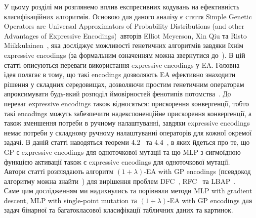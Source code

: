 У цьому розділі ми розглянемо вплив експресивних кодувань на ефективність класифікаційних алгоритмів. Основою для даного аналізу є стаття \glqq Simple Genetic Operators are Universal Approximators of Probability Distributions (and other Advantages of Expressive Encodings)\grqq\ авторів Elliot Meyerson, Xin Qiu та Risto Miikkulainen~\cite{ct25}, яка досліджує можливості генетичних алгоритмів завдяки їхнім expressive encodings (за формальним означенням можна звернутися до~\cite[Definition 1, стор. 3]{ct25}). В цій статті описуються переваги використання expressive encodings у EA. Головна ідея полягає в тому, що такі encodings дозволяють EA ефективно знаходити рішення у складних середовищах, дозволяючи простим генетичним операторам~\cite[підрозділ 2.2.3, стор. 3]{ct25} апроксимувати будь-який розподіл ймовірностей фенотипів потомства~\cite[розділ 2.1, стор. 2]{ct25}. До переваг expressive encodings також відносяться: прискорення конвергенції, тобто такі encodings можуть забезпечити надекспоненційне прискорення конвергенції, а також зменшення потреби в ручному налаштуванні, завдяки expressive encodings немає потреби у складному ручному налаштуванні операторів для кожної окремої задачі. В даній статті наводяться теореми 4.2~\cite[Theorem 4.2]{ct25} та 4.4~\cite[Theorem 4.4]{ct25}, в яких йдеться про те, що GP є expressive encodings для одноточкової мутації та що MLP з сигмоїдною функцією активації також є expressive encodings для одноточкової мутації. Автори статті розглядають алгоритм $(1+\lambda)$-EA with GP encodings (псевдокод алгоритму можна знайти~\cite[Appendix B, стор. 12]{ct25}) для вирішення проблем DFC~\cite[Problem 1, стор. 6]{ct25}, RFC~\cite[Problem 2, стор. 7]{ct25} та LBAP~\cite[Problem 3, стор. 7]{ct25}. Саме цим дослідженням ми надихнулись та порівняли методи MLP with gradient descent, MLP with single-point mutation та $(1+\lambda)$-EA with GP encodings для задач бінарної та багатокласової класифікації табличних даних та картинок.

\chapconclude{\ref{chap:theory}}

